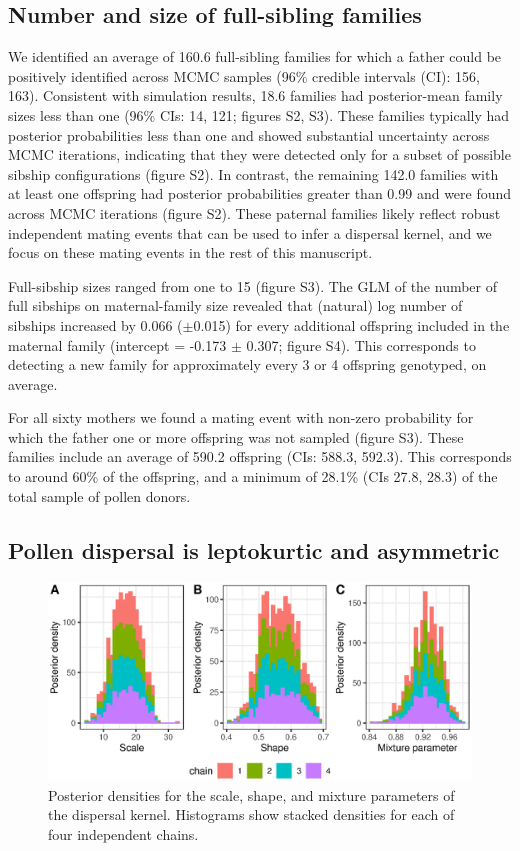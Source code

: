 \documentclass[10pt, a4paper, twocolumn]{article} %
\begin{document}
\subsection{Number and size of full-sibling families}

We identified an average of 160.6 full-sibling families for which a father could be positively identified across MCMC samples (96\% credible intervals (CI): 156, 163).
Consistent with simulation results, 18.6 families had posterior-mean family sizes less than one (96\% CIs: 14, 121; figures S2, S3).
These families typically had posterior probabilities less than one and showed substantial uncertainty across MCMC iterations, indicating that they were detected only for a subset of possible sibship configurations (figure S2).
In contrast, the remaining 142.0 families with at least one offspring had posterior probabilities greater than 0.99 and were found across MCMC iterations (figure S2).
These paternal families likely reflect robust independent mating events that can be used to infer a dispersal kernel, and we focus on these mating events in the rest of this manuscript.

Full-sibship sizes ranged from one to 15 (figure S3).
The GLM of the number of full sibships on maternal-family size revealed that (natural) log number of sibships increased by 0.066 ($\pm$0.015) for every additional offspring included in the maternal family (intercept = -0.173 $\pm$ 0.307; figure S4). This corresponds to detecting a new family for approximately every 3 or 4 offspring genotyped, on average.

For all sixty mothers we found a mating event with non-zero probability for which the father one or more offspring was not sampled (figure S3).
These families include an average of 590.2 offspring (CIs: 588.3, 592.3).
This corresponds to around 60\% of the offspring, and a minimum of 28.1\% (CIs 27.8, 28.3) of the total sample of pollen donors.

\subsection{Pollen dispersal is leptokurtic and asymmetric}

\begin{figure}
    \centering
    \includegraphics{posterior_distributions.eps}
    \caption{
        Posterior densities for the scale, shape, and mixture parameters of the dispersal kernel.
        Histograms show stacked densities for each of four independent chains.
    }
    \label{fig:posterior_summaries}
\end{figure}
\end{document}
